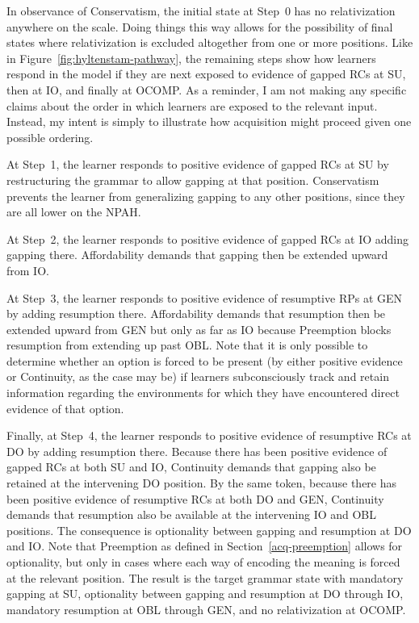 In observance of Conservatism, the initial state at Step~0 has no relativization anywhere on the scale. Doing things this way allows for the possibility of final states where relativization is excluded altogether from one or more positions. Like in Figure~\ref{fig:hyltenstam-pathway}, the remaining steps show how learners respond in the model if they are next exposed to evidence of gapped RCs at SU, then at IO, and finally at OCOMP. As a reminder, I am not making any specific claims about the order in which learners are exposed to the relevant input. Instead, my intent is simply to illustrate how acquisition might proceed given one possible ordering.

At Step~1, the learner responds to positive evidence of gapped RCs at SU by restructuring the grammar to allow gapping at that position. Conservatism prevents the learner from generalizing gapping to any other positions, since they are all lower on the NPAH. 

At Step~2, the learner responds to positive evidence of gapped RCs at IO adding gapping there. Affordability demands that gapping then be extended upward from IO.  

At Step~3, the learner responds to positive evidence of resumptive RPs at GEN by adding resumption there. Affordability demands that resumption then be extended upward from GEN but only as far as IO because Preemption blocks resumption from extending up past OBL. Note that it is only possible to determine whether an option is forced to be present (by either positive evidence or Continuity, as the case may be) if learners subconsciously track and retain information regarding the environments for which they have encountered direct evidence of that option.

Finally, at Step~4, the learner responds to positive evidence of resumptive RCs at DO by adding resumption there. Because there has been positive evidence of gapped RCs at both SU and IO, Continuity demands that gapping also be retained at the intervening DO position. By the same token, because there has been positive evidence of resumptive RCs at both DO and GEN, Continuity demands that resumption also be available at the intervening IO and OBL positions. The consequence is optionality between gapping and resumption at DO and IO. Note that Preemption as defined in Section~\ref{acq-preemption} allows for optionality, but only in cases where each way of encoding the meaning is forced at the relevant position. The result is the target grammar state with mandatory gapping at SU, optionality between gapping and resumption at DO through IO, mandatory resumption at OBL through GEN, and no relativization at OCOMP. 

